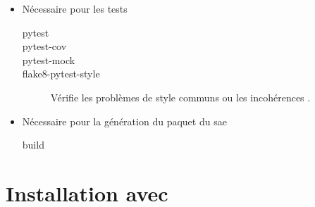 \begin{itemize}
    \item Nécessaire pour les tests
          \begin{description}
              \item[pytest]
              \item[pytest-cov]
              \item[pytest-mock]
              \item[flake8-pytest-style]
                  Vérifie les problèmes de style communs ou les incohérences \cite{flake8_pytest_style}.
          \end{description}

    \item Nécessaire pour la génération du \gls{paquet} du \gls{sae}
          \begin{description}
              \item[build]
          \end{description}
\end{itemize}


\section{Installation avec }

